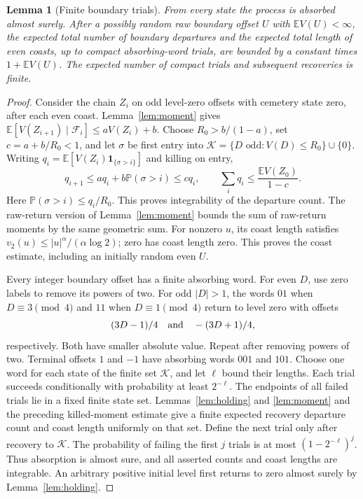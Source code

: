 \documentclass[11pt]{amsart}
\newtheorem{lemma}[theorem]{Lemma}
\theoremstyle{definition}
\theoremstyle{remark}
\newcommand{\E}{\mathbb E}
\newcommand{\PP}{\mathbb P}
\newcommand{\one}{\mathbf 1}
\begin{document}
\begin{lemma}[Finite boundary trials]\label{lem:trials}
From every state the process is absorbed almost surely. After a possibly random raw boundary offset $U$ with $\E V(U)<\infty$, the expected total number of boundary departures and the expected total length of even coasts, up to compact absorbing-word trials, are bounded by a constant times $1+\E V(U)$.
The expected number of compact trials and subsequent recoveries is finite.
\end{lemma}
\begin{proof}
Consider the chain $Z_i$ on odd level-zero offsets with cemetery state zero, after each even coast. Lemma~\ref{lem:moment} gives
$\E[V(Z_{i+1})\mid\mathcal F_i]\le aV(Z_i)+b$.
Choose $R_0>b/(1-a)$, set $c=a+b/R_0<1$, and let $\sigma$ be first entry into
$\mathcal K=\{D\text{ odd}:V(D)\le R_0\}\cup\{0\}$.
Writing $q_i=\E[V(Z_i)\one_{\{\sigma>i\}}]$ and killing on entry,
\[
 q_{i+1}\le a q_i+b\PP(\sigma>i)\le c q_i,
 \qquad \sum_iq_i\le\frac{\E V(Z_0)}{1-c}.
\]
Here $\PP(\sigma>i)\le q_i/R_0$. This proves integrability of the departure count. The raw-return version of Lemma~\ref{lem:moment} bounds the sum of raw-return moments by the same geometric sum. For nonzero $u$, its coast length satisfies
$v_2(u)\le |u|^\alpha/(\alpha\log2)$; zero has coast length zero. This proves the coast estimate, including an initially random even $U$.

Every integer boundary offset has a finite absorbing word. For even $D$, use zero labels to remove its powers of two. For odd $|D|>1$, the words $01$ when $D\equiv3\pmod4$ and $11$ when $D\equiv1\pmod4$ return to level zero with offsets
\[
 (3D-1)/4\quad\hbox{and}\quad -(3D+1)/4,
\]
respectively. Both have smaller absolute value. Repeat after removing powers of two. Terminal offsets $1$ and $-1$ have absorbing words $001$ and $101$.
Choose one word for each state of the finite set $\mathcal K$, and let $\ell$ bound their lengths. Each trial succeeds conditionally with probability at least $2^{-\ell}$.
The endpoints of all failed trials lie in a fixed finite state set. Lemmas~\ref{lem:holding} and \ref{lem:moment} and the preceding killed-moment estimate give a finite expected recovery departure count and coast length uniformly on that set. Define the next trial only after recovery to $\mathcal K$. The probability of failing the first $j$ trials is at most $(1-2^{-\ell})^j$.
Thus absorption is almost sure, and all asserted counts and coast lengths are integrable. An arbitrary positive initial level first returns to zero almost surely by Lemma~\ref{lem:holding}.
\end{proof}
\end{document}

